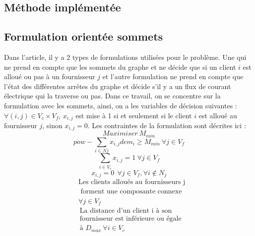 \documentclass[12pt,a4paper]{article}
\begin{document}
\begin{multicols}{2}
\section{Méthode implémentée}
\subsection{Formulation orientée sommets}
Dans l'article, il y a 2 types de formulations utilisées pour le problème. Une qui ne prend en compte que les sommets du graphe et ne décide que si un client $i$ est alloué ou pas à un fournisseur $j$ et l'autre formulation ne prend en compte que l'état des différentes arrêtes du graphe et décide s'il y a un flux de courant électrique qui la traverse ou pas.\newline\indent
Dans ce travail, on se concentre sur la formulation avec les sommets, ainsi, on a les variables de décision suivantes : $\forall (i,j) \in V_{c}\times V_{f}$, $ x_{i,j}$ est mise à 1 si et seulement si le client $i$ est alloué au fournisseur $j$, sinon $x_{i,j}=0$. Les contraintes de la formulation sont décrites ici :
\begin{equation}\label{eq:Obj}
Maximiser \ M_{min}
\end{equation}
\begin{equation}\label{eq:powDem}
pow -\sum_{i \in N{j}}{x_{i,j}dem_{i}} \geq M_{min} \ \forall j \in V_{f}
\end{equation}
\begin{equation}\label{eq:oneFeeder}
\sum_{i \in V_{c}}{x_{i,j}}=1 \ \forall j \in V_{f}
\end{equation}
\begin{equation}\label{eq:N_j}
x_{i,j}=0 \ \ \forall j \in V_{f},\forall i \notin N_{j}
\end{equation}
\begin{equation}
\begin{aligned}\label{eq:connect}
&\mbox{Les clients alloués au fournisseurs j} \\ 
&\mbox{ forment une composante connexe } \\
& \forall j \in V_{f}
\end{aligned}
\end{equation}
\begin{equation}\label{eq:dist}
\begin{aligned}
&\mbox{La distance d'un client i à son}\\ 
&\mbox{fournisseur est inférieure ou égale } \\
& \mbox{à } D_{max} \ \forall i \in V_{c}

\end{aligned}
\end{equation}
\end{multicols}
\end{document}
